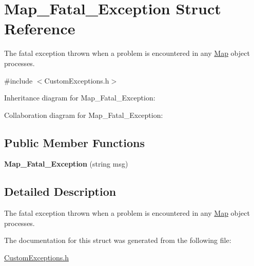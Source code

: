 \hypertarget{struct_map___fatal___exception}{}\section{Map\+\_\+\+Fatal\+\_\+\+Exception Struct Reference}
\label{struct_map___fatal___exception}


The fatal exception thrown when a problem is encountered in any \hyperlink{class_map}{Map} object processes.  




{\ttfamily \#include $<$Custom\+Exceptions.\+h$>$}



Inheritance diagram for Map\+\_\+\+Fatal\+\_\+\+Exception\+:


Collaboration diagram for Map\+\_\+\+Fatal\+\_\+\+Exception\+:
\subsection*{Public Member Functions}
\begin{DoxyCompactItemize}
\item 
{\bfseries Map\+\_\+\+Fatal\+\_\+\+Exception} (string msg)\hypertarget{struct_map___fatal___exception_a9ec327b70d3659e84c0b70ed8e74f775}{}\label{struct_map___fatal___exception_a9ec327b70d3659e84c0b70ed8e74f775}

\end{DoxyCompactItemize}


\subsection{Detailed Description}
The fatal exception thrown when a problem is encountered in any \hyperlink{class_map}{Map} object processes. 

The documentation for this struct was generated from the following file\+:\begin{DoxyCompactItemize}
\item 
\hyperlink{_custom_exceptions_8h}{Custom\+Exceptions.\+h}\end{DoxyCompactItemize}
